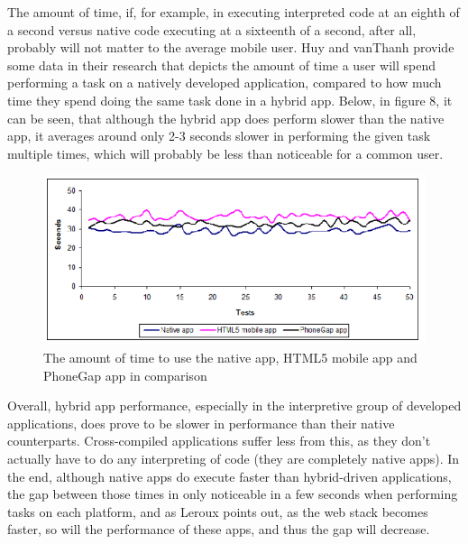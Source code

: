 \documentclass[11pt, twocolumn]{article}
\begin{document}
The amount of time, if, for example, in executing interpreted code at an eighth of a second versus native code executing at a sixteenth of a second, after all, probably will not matter to the average mobile user.  Huy and vanThanh provide some data in their research that depicts the amount of time a user will spend performing a task on a natively developed application, compared to how much time they spend doing the same task done in a hybrid app.  Below, in figure 8, it can be seen, that although the hybrid app does perform slower than the native app, it averages around only 2-3 seconds slower in performing the given task multiple times, which will probably be less than noticeable for a common user.\\

\begin{figure}[h]
\includegraphics[scale=0.4]{huy-app-performance}
\caption{The amount of time to use the native app, HTML5 mobile app and PhoneGap app in comparison ~\cite{Huy2012}}
\end{figure}

Overall, hybrid app performance, especially in the interpretive group of developed applications, does prove to be slower in performance than their native counterparts.  Cross-compiled applications suffer less from this, as they don't actually have to do any interpreting of code (they are completely native apps).  In the end, although native apps do execute faster than hybrid-driven applications, the gap between those times in only noticeable in a few seconds when performing tasks on each platform, and as Leroux points out, as the web stack becomes faster, so will the performance of these apps, and thus the gap will decrease. ~\cite{Leroux2011}
\end{document}
